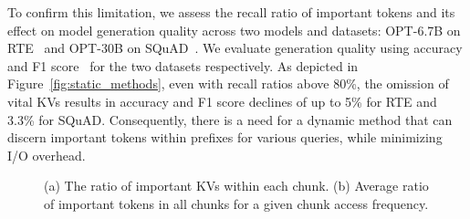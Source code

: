 To confirm this limitation, we assess the recall ratio of important tokens and
its effect on model generation quality across two models and datasets: OPT-6.7B
on RTE~\cite{lmeval} and OPT-30B on SQuAD~\cite{squad-arxiv18}. We evaluate
generation quality using accuracy and F1 score~\cite{cachegen-sigcomm24} for the two datasets respectively. As depicted in
Figure~\ref{fig:static_methods}, even with recall ratios above 80\%, the omission
of vital KVs results in accuracy and F1 score declines of up to 5\% for RTE and
3.3\% for SQuAD.
Consequently, there is a need for a dynamic method that can discern important tokens within prefixes for various queries, while minimizing I/O overhead.


\begin{figure}
	\centering
	\hspace{0.03in}
	\vspace{-0.2in}
	\caption{
		(a) The ratio of important KVs within each chunk. 
		(b) Average ratio of important tokens in all chunks for a given chunk access frequency.}
	\label{fig:cha2}
	\vspace{-0.2in}
\end{figure}

\noindent 
{}

